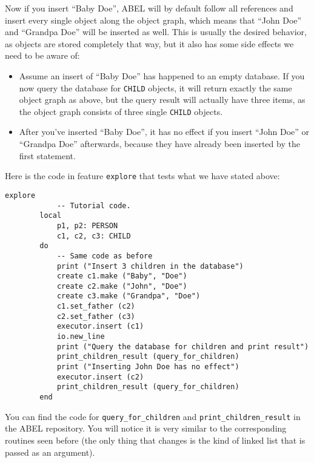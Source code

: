 \documentclass[a4paper,12pt]{report}
\begin{document}
	\begin{center}
	\end{center}

Now if you insert ``Baby Doe'', ABEL will by default follow all references and insert every single object along the object graph, which means that ``John Doe'' and ``Grandpa Doe'' will be inserted as well.
This is usually the desired behavior, as objects are stored completely that way, but it also has some side effects we need to be aware of:

\begin{itemize}
\item Assume an insert of ``Baby Doe'' has happened to an empty database. 
If you now query the database for \lstinline!CHILD! objects, it will return exactly the same object graph as above, but the query result will actually have three items, as the object graph consists of three single \lstinline!CHILD! objects.
	
\item After you've inserted ``Baby Doe'', it has no effect if you insert ``John Doe'' or ``Grandpa Doe'' afterwards, because they have already been inserted by the first statement.
\end{itemize}

Here is the code in feature \lstinline{explore} that tests what we have stated above:
\begin{lstlisting}[language=OOSC2Eiffel, captionpos=b, caption={Inserting objects having references to other objects.}, label={lst:references_handling}]
	explore
			-- Tutorial code.
		local
			p1, p2: PERSON
			c1, c2, c3: CHILD
		do
			-- Same code as before
			print ("Insert 3 children in the database")
			create c1.make ("Baby", "Doe")
			create c2.make ("John", "Doe")
			create c3.make ("Grandpa", "Doe")
			c1.set_father (c2)
			c2.set_father (c3)
			executor.insert (c1)
			io.new_line
			print ("Query the database for children and print result")
			print_children_result (query_for_children)
			print ("Inserting John Doe has no effect")
			executor.insert (c2)
			print_children_result (query_for_children)
		end
\end{lstlisting}
You can find the code for \lstinline{query_for_children} and \lstinline{print_children_result} in the ABEL repository. You will notice it is very similar to the corresponding routines seen before (the only thing that changes is the kind of linked list that is passed as an argument).
\end{document}
